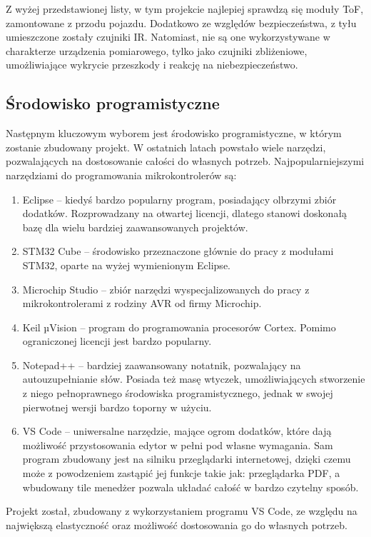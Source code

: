             Z wyżej przedstawionej listy, w tym projekcie najlepiej sprawdzą się moduły ToF, zamontowane z przodu pojazdu.
            Dodatkowo ze względów bezpieczeństwa, z tyłu umieszczone zostały czujniki IR.
            Natomiast, nie są one wykorzystywane w charakterze urządzenia pomiarowego, tylko jako czujniki zbliżeniowe, umożliwiające wykrycie przeszkody i reakcję na niebezpieczeństwo.

    \subsection{Środowisko programistyczne}
        Następnym kluczowym wyborem jest środowisko programistyczne, w którym zostanie zbudowany projekt.
        W ostatnich latach powstało wiele narzędzi, pozwalających na dostosowanie całości do własnych potrzeb.
        Najpopularniejszymi narzędziami do programowania mikrokontrolerów są:
        \begin{enumerate}
            \item Eclipse -- kiedyś bardzo popularny program, posiadający olbrzymi zbiór dodatków.
            Rozprowadzany na otwartej licencji, dlatego stanowi doskonałą bazę dla wielu bardziej zaawansowanych projektów.
            \item STM32 Cube -- środowisko przeznaczone głównie do pracy z modułami STM32, oparte na wyżej wymienionym Eclipse.
            \item Microchip Studio -- zbiór narzędzi wyspecjalizowanych do pracy z mikrokontrolerami z rodziny AVR od firmy Microchip.
            \item Keil µVision -- program do programowania procesorów Cortex. Pomimo ograniczonej licencji jest bardzo popularny.
            \item Notepad++ -- bardziej zaawansowany notatnik, pozwalający na autouzupełnianie słów.
            Posiada też masę wtyczek, umożliwiających stworzenie z niego pełnoprawnego środowiska programistycznego, jednak w swojej pierwotnej wersji bardzo toporny w użyciu.
            \item VS Code -- uniwersalne narzędzie, mające ogrom dodatków, które dają możliwość przystosowania edytor w pełni pod własne wymagania.
            Sam program zbudowany jest na silniku przeglądarki internetowej, dzięki czemu może z powodzeniem zastąpić jej funkcje takie jak: przeglądarka PDF, a wbudowany tile menedżer pozwala układać całość w bardzo czytelny sposób.
        \end{enumerate}
        Projekt został, zbudowany z wykorzystaniem programu VS Code, ze względu na największą elastyczność oraz możliwość dostosowania go do własnych potrzeb.


